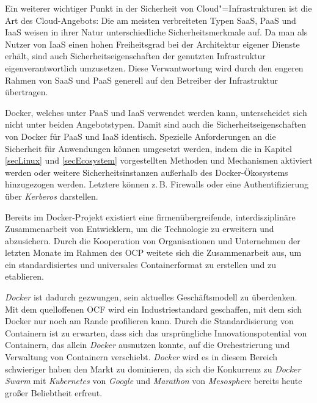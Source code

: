 \documentclass[../main.tex]{subfiles}
\begin{document}
  Ein weiterer wichtiger Punkt in der Sicherheit von Cloud"=Infrastrukturen ist die Art des Cloud-Angebots: Die am meisten verbreiteten Typen SaaS, PaaS und IaaS weisen in ihrer Natur unterschiedliche Sicherheitsmerkmale auf. Da man als Nutzer von IaaS einen hohen Freiheitsgrad bei der Architektur eigener Dienste erhält, sind auch Sicherheitseigenschaften der genutzten Infrastruktur eigenverantwortlich umzusetzen. Diese Verwantwortung wird durch den engeren Rahmen von SaaS und PaaS generell auf den Betreiber der Infrastruktur übertragen.

  Docker, welches unter PaaS und IaaS verwendet werden kann, unterscheidet sich nicht unter beiden Angebotstypen. Damit sind auch die Sicherheitseigenschaften von Docker für PaaS und IaaS identisch. Spezielle Anforderungen an die Sicherheit für Anwendungen können umgesetzt werden, indem die in Kapitel \ref{secLinux} und \ref{secEcosystem} vorgestellten Methoden und Mechanismen aktiviert werden oder weitere Sicherheitsinstanzen außerhalb des Docker-Ökosystems hinzugezogen werden. Letztere können z.\,B. Firewalls oder eine Authentifizierung über \emph{Kerberos} darstellen.





  Bereits im Docker-Projekt existiert eine firmenübergreifende, interdisziplinäre Zusammenarbeit von Entwicklern, um die Technologie zu erweitern und abzusichern. Durch die Kooperation von Organisationen und Unternehmen der letzten Monate im Rahmen des \acrshort{OCP} weitete sich die Zusammenarbeit aus, um ein standardisiertes und universales Containerformat zu erstellen und zu etablieren.

  \emph{Docker} ist dadurch gezwungen, sein aktuelles Geschäftsmodell zu überdenken. Mit dem quelloffenen OCF wird ein Industriestandard geschaffen, mit dem sich Docker nur noch am Rande profilieren kann. Durch die Standardisierung von Containern ist zu erwarten, dass sich das ursprüngliche Innovationspotential von Containern, das allein \emph{Docker} ausnutzen konnte, auf die Orchestrierung und Verwaltung von Containern verschiebt. \emph{Docker} wird es in diesem Bereich schwieriger haben den Markt zu dominieren, da sich die Konkurrenz zu \emph{Docker Swarm} mit \emph{Kubernetes} von \emph{Google} und \emph{Marathon} von \emph{Mesosphere} bereits heute großer Beliebtheit erfreut.
\end{document}
